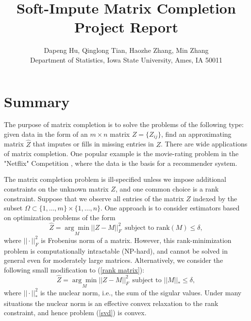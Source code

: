 \documentclass[12pt]{article}
\begin{document}
	
\author{Dapeng Hu, Qinglong Tian, Haozhe Zhang, Min Zhang\\
	Department of Statistics, Iowa State University, Ames, IA 50011\\}
\title{\bf Soft-Impute Matrix Completion Project Report}
\date{}
\maketitle

\section{Summary}
The purpose of matrix completion is to solve the problems of the following type: given data in the
form of an $m\times n$ matrix $Z = \{Z_{ij}\}$, find an approximating matrix $\widehat{Z}$ that imputes or fills in missing entries in $Z$. There are wide applications of matrix completion. One popular example is the movie-rating problem in the "Netflix" Competition , where the data is the basis for a recommender system.

The matrix completion problem is ill-specified
unless we impose additional constraints on the unknown matrix $Z$, and one
common choice is a rank constraint.  Suppose that we observe all entries of the matrix $Z$ indexed by the subset $\Omega \subset \{1, \ldots ,m\} \times \{1, \ldots, n\}$. One approach is to consider estimators based on optimization problems of the form
\begin{equation}\label{rank matrix}
\widehat{Z} = \underset{M}{\arg \min} ||Z-M||^{2}_{F} ~~\text{subject to rank}(M) \leq \delta,
\end{equation}
where $||\cdot||_{F}^{2}$ is Frobenius norm of a matrix. However, this rank-minimization problem is computationally intractable (NP-hard), and cannot be solved in general even for moderately large matrices. Alternatively, we consider the following small modification to (\ref{rank matrix}):
\begin{equation}\label{svd}
\widehat{Z} = \underset{M}{\arg \min} ||Z-M||^{2}_{F} ~~\text{subject to }||M||_{*} \leq \delta,
\end{equation}
where $||\cdot||_{*}^{2}$ is the nuclear norm, i.e., the sum of the sigular values. Under many situations the nuclear norm is an effective convex relaxation to the rank
constraint, and hence problem (\ref{svd}) is convex. 
\end{document}
